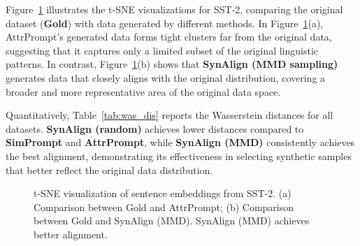 Figure~\ref{fig:good_distribution} illustrates the t-SNE visualizations for SST-2, comparing the original dataset (\textbf{Gold}) with data generated by different methods.
In Figure~\ref{fig:good_distribution}(a), AttrPrompt's generated data forms tight clusters far from the original data, suggesting that it captures only a limited subset of the original linguistic patterns.
In contrast, Figure~\ref{fig:good_distribution}(b) shows that \textbf{SynAlign (MMD sampling)} generates data that closely aligns with the original distribution, covering a broader and more representative area of the original data space.


Quantitatively, Table~\ref{tab:was_dis} reports the Wasserstein distances for all datasets. \textbf{SynAlign (random)} achieves lower distances compared to \textbf{SimPrompt} and \textbf{AttrPrompt}, while \textbf{SynAlign (MMD)} consistently achieves the best alignment, demonstrating its effectiveness in selecting synthetic samples that better reflect the original data distribution.



\begin{figure}[tbp]
    \centering
    \caption{t-SNE visualization of sentence embeddings from SST-2. (a) Comparison between Gold and AttrPrompt; (b) Comparison between Gold and SynAlign (MMD). SynAlign (MMD) achieves better alignment.}
    \label{fig:good_distribution}
\end{figure}

\begin{table}[!t]
\centering
\caption{Wasserstein Distance between original and generated datasets. Lower values indicate better alignment.}
\label{tab:was_dis}
\end{table}

